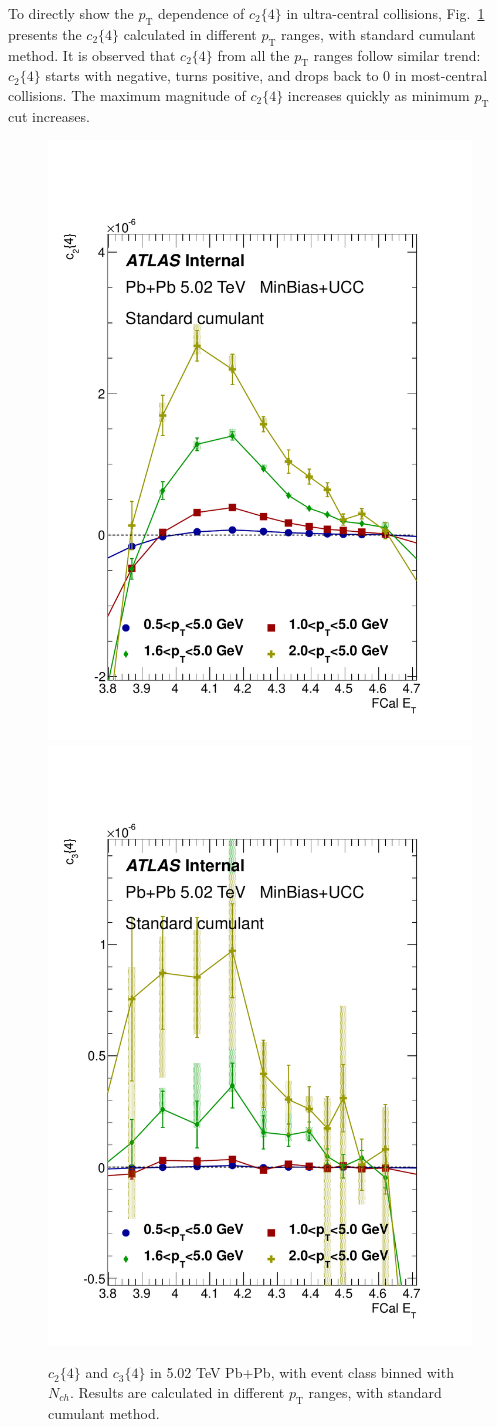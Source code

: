To directly show the $p_\text{T}$ dependence of $c_2\{4\}$ in ultra-central collisions, Fig.~\ref{fig:PbPb502_UCC_Nch_v2_pT} presents the $c_2\{4\}$ calculated in different $p_\text{T}$ ranges, with standard cumulant method. It is observed that $c_2\{4\}$ from all the $p_\text{T}$ ranges follow similar trend: $c_2\{4\}$ starts with negative, turns positive, and drops back to 0 in most-central collisions. The maximum magnitude of $c_2\{4\}$ increases quickly as minimum $p_\text{T}$ cut increases.
\begin{figure}[H]
\centering
\includegraphics[width=.45\linewidth]{figs/sec_result/PbPb502_UCC_Nch/PbPb502_pT_1sub_Har2.pdf}
\includegraphics[width=.45\linewidth]{figs/sec_result/PbPb502_UCC_Nch/PbPb502_pT_1sub_Har3.pdf}
\caption{$c_2\{4\}$ and $c_3\{4\}$ in 5.02 TeV Pb+Pb, with event class binned with $N_{ch}$. Results are calculated in different $p_\text{T}$ ranges, with standard cumulant method.}
\label{fig:PbPb502_UCC_Nch_v2_pT}
\end{figure}

